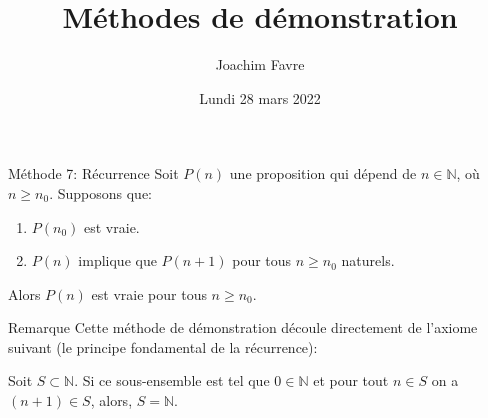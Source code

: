 \documentclass[a4paper]{article}
\title{Méthodes de démonstration}
\author{Joachim Favre}
\date{Lundi 28 mars 2022}
\begin{document}
\maketitle


\begin{parag}{Méthode 7: Récurrence}
    Soit $P\left(n\right)$ une proposition qui dépend de $n \in \mathbb{N}$, où $n \geq n_0$. Supposons que:
    \begin{enumerate}
        \item $P\left(n_0\right)$ est vraie.
        \item $P\left(n\right)$ implique que $P\left(n+1\right)$ pour tous $n \geq n_0$ naturels.
    \end{enumerate}
    
    Alors $P\left(n\right)$ est vraie pour tous $n \geq n_0$.

    \begin{subparag}{Remarque}
        Cette méthode de démonstration découle directement de l'axiome suivant (le principe fondamental de la récurrence):
    
        Soit $S \subset \mathbb{N}$. Si ce sous-ensemble est tel que $0 \in \mathbb{N}$ et pour tout $n \in S$ on a $\left(n + 1\right) \in S$, alors, $S = \mathbb{N}$.
    \end{subparag}
\end{parag}
\end{document}
